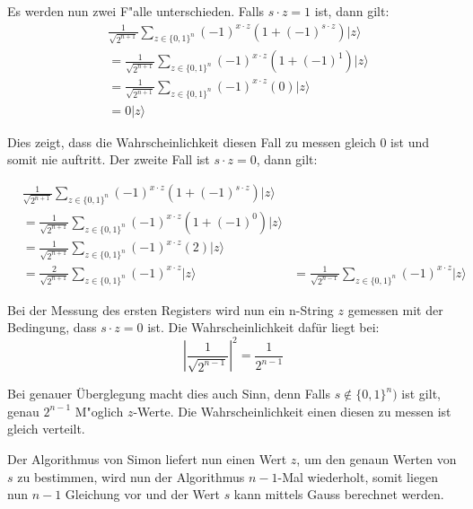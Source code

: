 \begin{refsection}
Es werden nun zwei F"alle unterschieden. Falls $s \cdot z = 1$ ist, dann gilt:
\begin{align*}
    &\frac1{\sqrt{2^{n + 1}}}
      \sum_{z \in \{0,1\}^n}  { (-1)^{x \cdot z} ( 1 + (-1)^{ s \cdot z}) |z\rangle } 
    \\
    &= 
    \frac1{\sqrt{2^{n + 1}}}
      \sum_{z \in \{0,1\}^n}  { (-1)^{x \cdot z} ( 1 + (-1)^1) |z\rangle } 
    \\
    &= 
    \frac1{\sqrt{2^{n + 1}}}
      \sum_{z \in \{0,1\}^n}  { (-1)^{x \cdot z} (0) |z\rangle } 
    \\
    &=
    0 |z\rangle
\end{align*}

Dies zeigt, dass die Wahrscheinlichkeit diesen Fall zu messen gleich 0 ist und
somit nie auftritt. Der zweite Fall ist $s \cdot z = 0$, dann gilt:

\begin{align*}
    &\frac1{\sqrt{2^{n + 1}}}
      \sum_{z \in \{0,1\}^n}  { (-1)^{x \cdot z} ( 1 + (-1)^{ s \cdot z}) |z\rangle } 
    \\
    &= 
    \frac1{\sqrt{2^{n + 1}}}
      \sum_{z \in \{0,1\}^n}  { (-1)^{x \cdot z} ( 1 + (-1)^0) |z\rangle } 
    \\
    &= 
    \frac1{\sqrt{2^{n + 1}}}
      \sum_{z \in \{0,1\}^n}  { (-1)^{x \cdot z} (2) |z\rangle } 
    \\
    &= 
    \frac{2}{\sqrt{2^{n + 1}}} 
      \sum_{z \in \{0,1\}^n}  { (-1)^{x \cdot z}|z\rangle } 
    &= 
    \frac1{\sqrt{2^{n - 1}}} 
      \sum_{z \in \{0,1\}^n}  { (-1)^{x \cdot z}|z\rangle } 
\end{align*}

Bei der Messung des ersten Registers wird nun ein n-String $z$ gemessen mit der
Bedingung, dass $s \cdot z = 0$ ist. Die Wahrscheinlichkeit dafür liegt bei:
\[
    |\frac1{\sqrt{2^{n - 1}}}|^2 = \frac1{2^{n-1}} 
\]

Bei genauer Überglegung macht dies auch Sinn, denn Falls $s \notin \{0,1\}^n)$
ist gilt, genau $2^{n-1}$ M"oglich $z$-Werte. Die Wahrscheinlichkeit einen
diesen zu messen ist gleich verteilt.

Der Algorithmus von Simon liefert nun einen Wert $z$, um den genaun Werten von
$s$ zu bestimmen, wird nun der Algorithmus $n-1$-Mal wiederholt, somit liegen
nun $n-1$ Gleichung vor und der Wert $s$ kann mittels Gauss berechnet werden.





\printbibliography[heading=subbibliography] \end{refsection}


